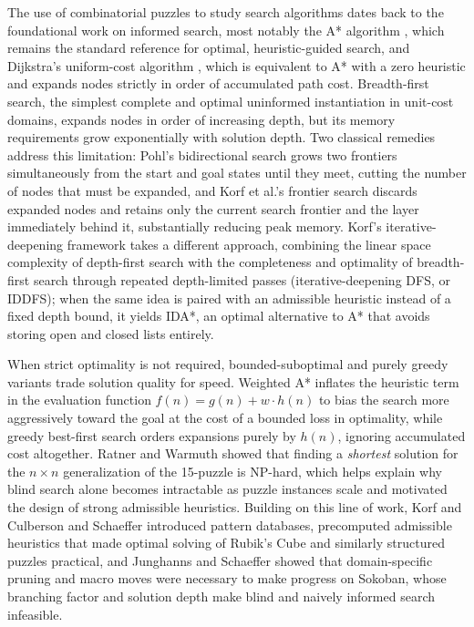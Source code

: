\documentclass[letterpaper]{article}
\begin{document}
The use of combinatorial puzzles to study search algorithms dates back to
the foundational work on informed search, most notably the A* algorithm
\cite{hart1968}, which remains the standard reference for optimal,
heuristic-guided search, and Dijkstra's uniform-cost algorithm
\cite{dijkstra1959}, which is equivalent to A* with a zero heuristic and
expands nodes strictly in order of accumulated path cost. Breadth-first
search, the simplest complete and optimal uninformed instantiation in
unit-cost domains, expands nodes in order of increasing depth, but its
memory requirements grow exponentially with solution depth. Two classical
remedies address this limitation: Pohl's
bidirectional search \cite{pohl1971} grows two frontiers simultaneously
from the start and goal states until they meet, cutting the number of
nodes that must be expanded, and Korf et al.'s frontier search
\cite{korf2005} discards expanded nodes and retains only the current
search frontier and the layer immediately behind it, substantially
reducing peak memory. Korf's iterative-deepening framework
\cite{korf1985} takes a different approach, combining the linear space
complexity of depth-first search with the completeness and optimality of
breadth-first search through repeated depth-limited passes
(iterative-deepening DFS, or IDDFS); when the same idea is paired with an
admissible heuristic instead of a fixed depth bound, it yields IDA*, an
optimal alternative to A* that avoids storing open and closed lists
entirely.

When strict optimality is not required, bounded-suboptimal and purely
greedy variants trade solution quality for speed. Weighted A*
\cite{pohl1970} inflates the heuristic term in the evaluation function
$f(n) = g(n) + w \cdot h(n)$ to bias the search more aggressively toward
the goal at the cost of a bounded loss in optimality, while greedy
best-first search \cite{doran1966} orders expansions purely by $h(n)$,
ignoring accumulated cost altogether. Ratner and Warmuth
\cite{ratner1986} showed that finding a \emph{shortest} solution for the
$n \times n$ generalization of the 15-puzzle is NP-hard, which helps
explain why blind search alone becomes intractable as puzzle instances
scale and motivated the design of strong admissible heuristics. Building
on this line of work, Korf \cite{korf1997} and Culberson and Schaeffer
\cite{culberson1998} introduced pattern databases, precomputed admissible
heuristics that made optimal solving of Rubik's Cube and similarly
structured puzzles practical, and Junghanns and Schaeffer
\cite{junghanns2001} showed that domain-specific pruning and macro moves
were necessary to make progress on Sokoban, whose branching factor and
solution depth make blind and naively informed search infeasible.
\end{document}
